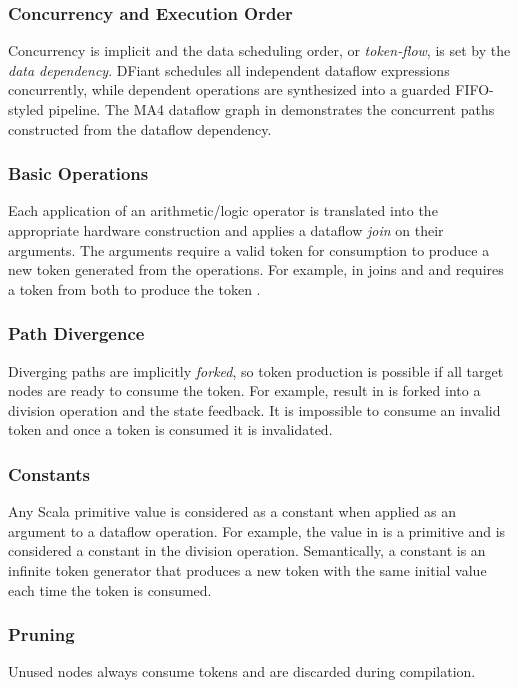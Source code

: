 \subsubsection{Concurrency and Execution Order} 
Concurrency is implicit and the data scheduling order, or \textit{token-flow}, is set by the \textit{data dependency}. DFiant schedules all independent dataflow expressions concurrently, while dependent operations are synthesized into a guarded FIFO-styled pipeline. The MA4 dataflow graph in  demonstrates the concurrent paths constructed from the dataflow dependency. 

\subsubsection{Basic Operations} 
\label{sec:basic_ops}
Each application of an arithmetic/logic operator is translated into the appropriate hardware construction and applies a dataflow \emph{join} on their arguments. The arguments require a valid token for consumption to produce a new token generated from the operations. For example, \code{+} in  joins  and  and requires a token from both to produce the token .

\subsubsection{Path Divergence} 
\label{sec:path_div}
Diverging paths are implicitly \emph{forked}, so token production is possible if all target nodes are ready to consume the token. For example,  result in  is forked into a division operation and the state feedback.	It is impossible to consume an invalid token and once a token is consumed it is invalidated.

\subsubsection{Constants} 
Any Scala primitive value is considered as a constant when applied as an argument to a dataflow operation. For example, the value  in  is a primitive  and is considered a constant in the division operation. Semantically, a constant is an infinite token generator that produces a new token with the same initial value each time the token is consumed.

\subsubsection{Pruning}
Unused nodes always consume tokens and are discarded during compilation. 

